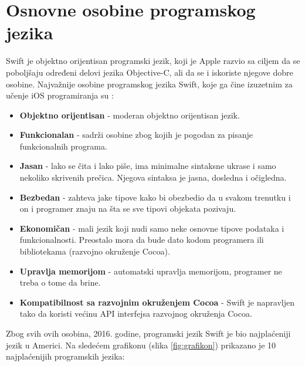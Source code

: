 \documentclass[a4paper]{article}
\begin{document}
\section{Osnovne osobine programskog jezika}	
\label{sec:cetvrtiDeo}
Swift je objektno orijentisan programski jezik, koji je Apple razvio sa ciljem da 
se poboljšaju određeni delovi jezika Objective-C, ali da se i iskoriste njegove
dobre osobine. Najvažnije osobine programskog jezika Swift, koje ga čine izuzetnim za učenje iOS programiranja su \cite{swift_programming}:
\begin{itemize}
\item\textbf{Objektno orijentisan} - moderan objektno orijentisan jezik.
\item\textbf{Funkcionalan} - sadrži osobine zbog kojih je pogodan za pisanje funkcionalnih programa.
\item\textbf{Jasan} - lako se čita i lako piše, ima minimalne sintaksne ukrase i samo nekoliko skrivenih prečica. Njegova sintaksa je jasna, dosledna i očigledna.
\item\textbf{Bezbedan} - zahteva jake tipove kako bi obezbedio da u svakom trenutku i on i programer znaju na šta se sve tipovi objekata pozivaju.
\item\textbf{Ekonomičan} - mali jezik koji nudi samo neke osnovne tipove podataka i funkcionalnosti. Preostalo mora da bude dato kodom programera ili bibliotekama (razvojno okruženje Cocoa).
\item\textbf{Upravlja memorijom} - automatski upravlja memorijom, programer ne treba o tome da brine.
\item\textbf{Kompatibilnost sa razvojnim okruženjem Cocoa} -  Swift je napravljen tako da koristi većinu API interfejsa razvojnog okruženja Cocoa.
\end{itemize}

Zbog svih ovih osobina, 2016. godine, programski jezik Swift je bio najplaćeniji jezik u Americi. Na sledećem grafikonu (slika \ref{fig:grafikon}) prikazano je 10 najplaćenijih programskih jezika:
\end{document}
